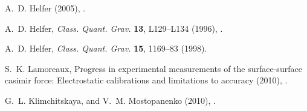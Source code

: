 \documentclass[12pt]{article}
\begin{document}
\begin{thebibliography}{57}
A.~D. Helfer  (2005), .

A.~D. Helfer, \emph{Class. Quant. Grav.} \textbf{13}, L129--L134 (1996),
  .

A.~D. Helfer, \emph{Class. Quant. Grav.} \textbf{15}, 1169--83 (1998).

S.~K. Lamoreaux, Progress in experimental measurements of the surface-surface
  casimir force: Electrostatic calibrations and limitations to accuracy (2010),
  .

G.~L. Klimchitskaya, and V.~M. Mostopanenko (2010),
  .

\end{thebibliography}
\end{document}
